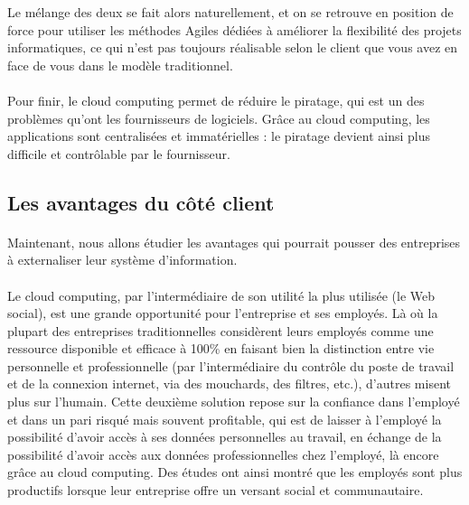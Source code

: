 \documentclass[a4paper,12pt]{report}
\begin{document}
\begin{onehalfspace}
	Le mélange des deux se fait alors naturellement, et on se retrouve en position de force pour utiliser les méthodes Agiles dédiées à améliorer la flexibilité des projets informatiques, ce qui n'est pas toujours réalisable selon le client que vous avez en face de vous dans le modèle traditionnel.
	
	\paragraph*{}
	Pour finir, le cloud computing permet de réduire le piratage, qui est un des problèmes qu’ont les fournisseurs de logiciels. Grâce au cloud computing, les applications sont centralisées et immatérielles : le piratage devient ainsi plus difficile et contrôlable par le fournisseur.
	
	\subsection{Les avantages du côté client}

	\paragraph*{}
	Maintenant, nous allons étudier les avantages qui pourrait pousser des entreprises à externaliser leur système d’information.

	\paragraph*{}
	Le cloud computing, par l’intermédiaire de son utilité la plus utilisée (le Web social), est une grande opportunité pour l’entreprise et ses employés. Là où la plupart des entreprises traditionnelles considèrent leurs employés comme une ressource disponible et efficace à 100\% en faisant bien la distinction entre vie personnelle et professionnelle (par l’intermédiaire du contrôle du poste de travail et de la connexion internet, via des mouchards, des filtres, etc.), d’autres misent plus sur l’humain.
Cette deuxième solution repose sur la confiance dans l’employé et dans un pari risqué mais souvent profitable, qui est de laisser à l’employé la possibilité d’avoir accès à ses données personnelles au travail, en échange de la possibilité d’avoir accès aux données professionnelles chez l’employé, là encore grâce au cloud computing. Des études ont ainsi montré que les employés sont plus productifs lorsque leur entreprise offre un versant social et communautaire.


\end{onehalfspace}
\end{document}
